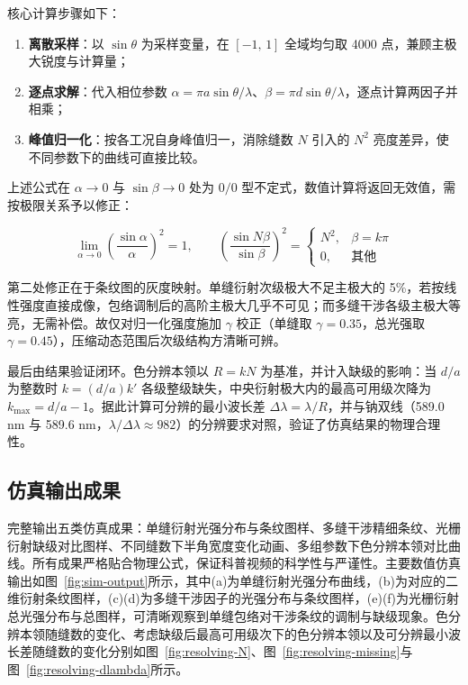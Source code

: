 \documentclass[12pt,a4paper]{ctexrep}
\begin{document}
核心计算步骤如下：

\begin{enumerate}[label=(\arabic*), leftmargin=2.4em, itemsep=2pt]
\item \textbf{离散采样}：以 $\sin\theta$ 为采样变量，在 $[-1,\,1]$ 全域均匀取 4000 点，兼顾主极大锐度与计算量；
\item \textbf{逐点求解}：代入相位参数 $\alpha=\pi a\sin\theta/\lambda$、$\beta=\pi d\sin\theta/\lambda$，逐点计算两因子并相乘；
\item \textbf{峰值归一化}：按各工况自身峰值归一，消除缝数 $N$ 引入的 $N^{2}$ 亮度差异，使不同参数下的曲线可直接比较。
\end{enumerate}

上述公式在 $\alpha\to 0$ 与 $\sin\beta\to 0$ 处为 $0/0$ 型不定式，数值计算将返回无效值，需按极限关系予以修正\cite{ref4}：

\begin{equation*}
\lim_{\alpha\to 0}\left(\frac{\sin\alpha}{\alpha}\right)^{2}=1,
\qquad
\left(\frac{\sin N\beta}{\sin\beta}\right)^{2}=
\begin{cases}
N^{2}, & \beta=k\pi\\[2pt]
0, & \text{其他}
\end{cases}
\end{equation*}

第二处修正在于条纹图的灰度映射。单缝衍射次级极大不足主极大的 5\%，若按线性强度直接成像，包络调制后的高阶主极大几乎不可见；而多缝干涉各级主极大等亮，无需补偿。故仅对归一化强度施加 $\gamma$ 校正（单缝取 $\gamma=0.35$，总光强取 $\gamma=0.45$），压缩动态范围后次级结构方清晰可辨。

最后由结果验证闭环。色分辨本领以 $R=kN$ 为基准，并计入缺级的影响：当 $d/a$ 为整数时 $k=(d/a)k'$ 各级整级缺失，中央衍射极大内的最高可用级次降为 $k_{\max}=d/a-1$。据此计算可分辨的最小波长差 $\Delta\lambda=\lambda/R$，并与钠双线（589.0 nm 与 589.6 nm，$\lambda/\Delta\lambda\approx 982$）的分辨要求对照，验证了仿真结果的物理合理性。

\subsection{仿真输出成果}

完整输出五类仿真成果：单缝衍射光强分布与条纹图样、多缝干涉精细条纹、光栅衍射缺级对比图样、不同缝数下半角宽度变化动画、多组参数下色分辨本领对比曲线。所有成果严格贴合物理公式，保证科普视频的科学性与严谨性。主要数值仿真输出如图~\ref{fig:sim-output}所示，其中(a)为单缝衍射光强分布曲线，(b)为对应的二维衍射条纹图样，(c)(d)为多缝干涉因子的光强分布与条纹图样，(e)(f)为光栅衍射总光强分布与总图样，可清晰观察到单缝包络对干涉条纹的调制与缺级现象。色分辨本领随缝数的变化、考虑缺级后最高可用级次下的色分辨本领以及可分辨最小波长差随缝数的变化分别如图~\ref{fig:resolving-N}、图~\ref{fig:resolving-missing}与图~\ref{fig:resolving-dlambda}所示。
\end{document}

